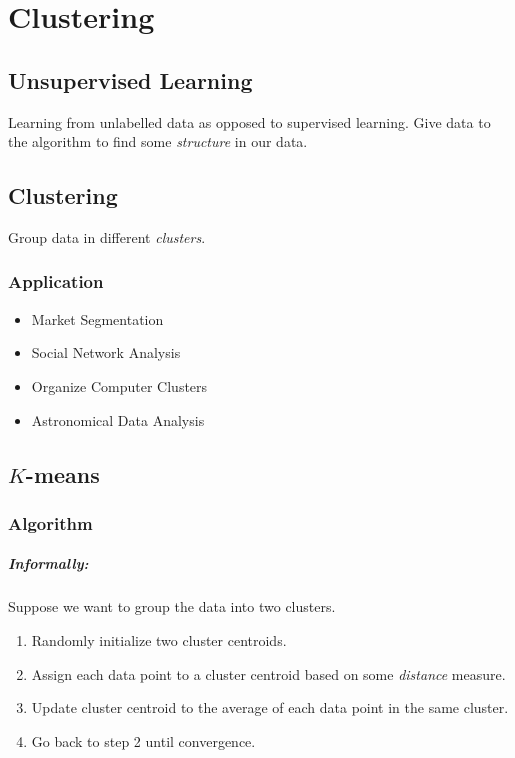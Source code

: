 \chapter{Clustering}
\section{Unsupervised Learning}
Learning from unlabelled data as opposed to supervised learning. Give data to the algorithm
to find some \emph{structure} in our data.

\section{Clustering}
Group data in different \emph{clusters}.

\subsection{Application}
\begin{itemize}
	\item Market Segmentation
	\item Social Network Analysis
	\item Organize Computer Clusters
	\item Astronomical Data Analysis
\end{itemize}

\section{\texorpdfstring{$K$-means}{}}
\subsection{Algorithm}
\paragraph{Informally:}
Suppose we want to group the data into two clusters.
\begin{enumerate}
	\item Randomly initialize two cluster centroids.
	\item Assign each data point to a cluster centroid based on some \emph{distance}
	      measure.
	\item Update cluster centroid to the average of each data point in the same
	      cluster.
	\item Go back to step 2 until convergence.
\end{enumerate}

